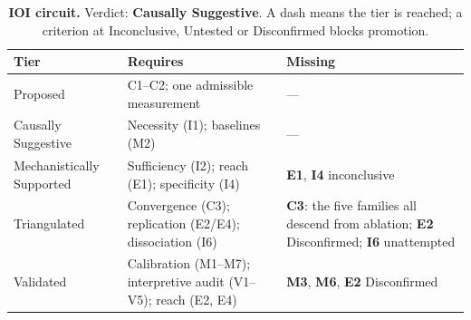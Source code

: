 \begin{table}[H]
\centering
\footnotesize
\caption{\textbf{IOI circuit.} Verdict: \textbf{Causally Suggestive}. A dash means the tier is reached; a criterion at
Inconclusive, Untested or Disconfirmed blocks promotion.}
\label{tab:ioi-verdict}
\renewcommand{\arraystretch}{1.18}
\begin{tabular}{@{}l>{\raggedright\arraybackslash}p{3.6cm}>{\raggedright\arraybackslash}p{4.4cm}@{}}
\toprule
\textbf{Tier} & \textbf{Requires} & \textbf{Missing} \\
\midrule
Proposed & C1--C2; one admissible measurement & --- \\
\addlinespace[2pt]
Causally Suggestive & Necessity (I1); baselines (M2) & --- \\
\addlinespace[2pt]
Mechanistically Supported & Sufficiency (I2); reach (E1); specificity (I4) & \textbf{E1}, \textbf{I4} inconclusive \\
\addlinespace[2pt]
Triangulated & Convergence (C3); replication (E2/E4); dissociation (I6) & \textbf{C3}: the five families all descend from ablation; \textbf{E2} Disconfirmed; \textbf{I6} unattempted \\
\addlinespace[2pt]
Validated & Calibration (M1--M7); interpretive audit (V1--V5); reach (E2, E4) & \textbf{M3}, \textbf{M6}, \textbf{E2} Disconfirmed \\
\bottomrule
\end{tabular}
\end{table}
